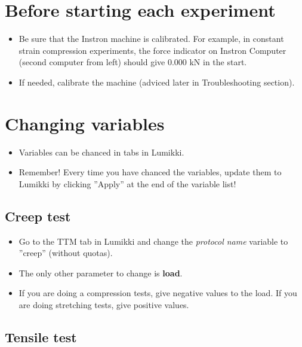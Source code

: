 \documentclass[a4paper]{article}
\begin{document}
\section{Before starting each experiment}

\begin{itemize}
  \item Be sure that the Instron machine is calibrated. For example, in constant strain compression experiments, the force indicator on Instron Computer (second computer from left) should give 0.000 kN in the start.
  \item If needed, calibrate the machine (adviced later in Troubleshooting section).
\end{itemize}

\section{Changing variables}

\begin{itemize}
  \item Variables can be chanced in tabs in Lumikki.
  \item Remember! Every time you have chanced the variables, update them to Lumikki by clicking ''Apply'' at the end of the variable list!
\end{itemize}

\subsection{Creep test}

\begin{itemize}
  \item Go to the TTM tab in Lumikki and change the \textit{protocol name} variable to ''creep'' (without quotas).
  \item The only other parameter to change is \textbf{load}.
  \item If you are doing a compression tests, give negative values to the load. If you are doing stretching tests, give positive values.
\end{itemize}

\subsection{Tensile test}
\end{document}

